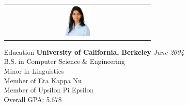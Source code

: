 \documentclass{resume}
\begin{document}
\begin{flushleft}

\hspace*{\fill}%
\begin{tabular}{@{}c@{}}
  \includegraphics[width=0.20\textwidth]{pic1.jpeg}
\end{tabular}

\end{flushleft}

\pagecolor{white}

  \begin{rSection}{Education}
    {\bf University of California, Berkeley} \hfill {\em June 2004} \\ 
    { B.S. in Computer Science \& Engineering } \\
    { Minor in Linguistics } \smallskip \\
    { Member of Eta Kappa Nu } \\
    { Member of Upsilon Pi Epsilon } \\
    Overall GPA: 5.678
  \end{rSection}
  
\end{document}
